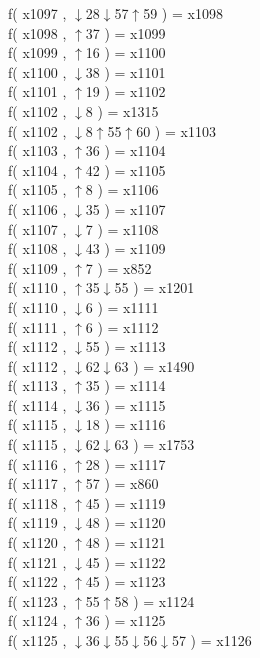 f( x1097 , $\downarrow$28$\downarrow$57$\uparrow$59 ) = x1098 \\
f( x1098 , $\uparrow$37 ) = x1099 \\
f( x1099 , $\uparrow$16 ) = x1100 \\
f( x1100 , $\downarrow$38 ) = x1101 \\
f( x1101 , $\uparrow$19 ) = x1102 \\
f( x1102 , $\downarrow$8 ) = x1315 \\
f( x1102 , $\downarrow$8$\uparrow$55$\uparrow$60 ) = x1103 \\
f( x1103 , $\uparrow$36 ) = x1104 \\
f( x1104 , $\uparrow$42 ) = x1105 \\
f( x1105 , $\uparrow$8 ) = x1106 \\
f( x1106 , $\downarrow$35 ) = x1107 \\
f( x1107 , $\downarrow$7 ) = x1108 \\
f( x1108 , $\downarrow$43 ) = x1109 \\
f( x1109 , $\uparrow$7 ) = x852 \\
f( x1110 , $\uparrow$35$\downarrow$55 ) = x1201 \\
f( x1110 , $\downarrow$6 ) = x1111 \\
f( x1111 , $\uparrow$6 ) = x1112 \\
f( x1112 , $\downarrow$55 ) = x1113 \\
f( x1112 , $\downarrow$62$\downarrow$63 ) = x1490 \\
f( x1113 , $\uparrow$35 ) = x1114 \\
f( x1114 , $\downarrow$36 ) = x1115 \\
f( x1115 , $\downarrow$18 ) = x1116 \\
f( x1115 , $\downarrow$62$\downarrow$63 ) = x1753 \\
f( x1116 , $\uparrow$28 ) = x1117 \\
f( x1117 , $\uparrow$57 ) = x860 \\
f( x1118 , $\uparrow$45 ) = x1119 \\
f( x1119 , $\downarrow$48 ) = x1120 \\
f( x1120 , $\uparrow$48 ) = x1121 \\
f( x1121 , $\downarrow$45 ) = x1122 \\
f( x1122 , $\uparrow$45 ) = x1123 \\
f( x1123 , $\uparrow$55$\uparrow$58 ) = x1124 \\
f( x1124 , $\uparrow$36 ) = x1125 \\
f( x1125 , $\downarrow$36$\downarrow$55$\downarrow$56$\downarrow$57 ) = x1126 \\
